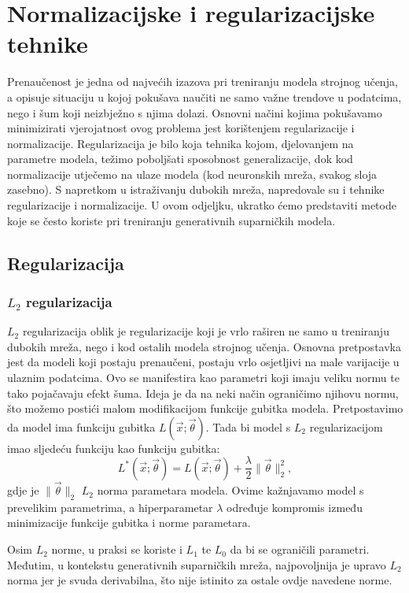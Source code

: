\section{Normalizacijske i regularizacijske tehnike}
Prenaučenost je jedna od najvećih izazova pri treniranju modela strojnog učenja, a opisuje situaciju u kojoj pokušava naučiti ne samo važne trendove u podatcima, nego i šum koji neizbježno s njima dolazi. Osnovni načini kojima pokušavamo minimizirati vjerojatnost ovog problema jest korištenjem regularizacije i normalizacije. Regularizacija je bilo koja tehnika kojom, djelovanjem na parametre modela, težimo poboljšati sposobnost generalizacije, dok kod normalizacije utječemo na ulaze modela (kod neuronskih mreža, svakog sloja zasebno). S napretkom u istraživanju dubokih mreža, napredovale su i tehnike regularizacije i normalizacije. U ovom odjeljku, ukratko ćemo predstaviti metode koje se često koriste pri treniranju generativnih suparničkih modela.

\subsection{Regularizacija}
\subsubsection{$L_2$ regularizacija}
$L_2$ regularizacija oblik je regularizacije koji je vrlo raširen ne samo u treniranju dubokih mreža, nego i kod ostalih modela strojnog učenja. Osnovna pretpostavka jest da modeli koji postaju prenaučeni, postaju vrlo osjetljivi na male varijacije u ulaznim podatcima. Ovo se manifestira kao parametri koji imaju veliku normu te tako pojačavaju efekt šuma. Ideja je da na neki način ograničimo njihovu normu, što možemo postići malom modifikacijom funkcije gubitka modela. Pretpostavimo da model ima funkciju gubitka $L(\vec{x};\vec{\theta})$. Tada bi model s $L_2$ regularizacijom imao sljedeću funkciju kao funkciju gubitka:
\begin{equation*}
L^*(\vec{x};\vec{\theta}) = L(\vec{x};\vec{\theta}) + \frac{\lambda}{2}\|\vec{\theta}\|_2^2, 
\end{equation*}
gdje je $\|\vec{\theta}\|_2$ $L_2$ norma parametara modela. Ovime kažnjavamo model s prevelikim parametrima, a hiperparametar $\lambda$ određuje kompromis između minimizacije funkcije gubitka i norme parametara. 

Osim $L_2$ norme, u praksi se koriste i $L_1$ te $L_0$ da bi se ograničili parametri. Međutim, u kontekstu generativnih suparničkih mreža, najpovoljnija je upravo $L_2$ norma jer je svuda derivabilna, što nije istinito za ostale ovdje navedene norme.

